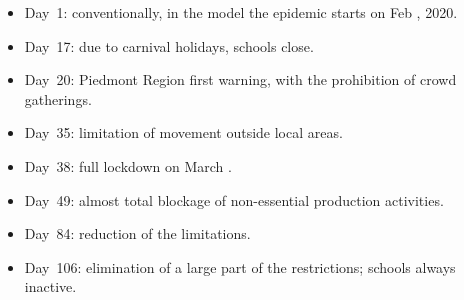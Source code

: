 \documentclass[11pt]{article}
\begin{document}
\begin{itemize}
\setlength{\itemsep}{0pt}

\item Day~1: conventionally, in the model the epidemic starts on Feb , 2020.

\item Day~17: due to carnival holidays, schools close.

\item Day~20: Piedmont Region first warning, with the prohibition of crowd gatherings.

\item Day~35: limitation of movement outside local areas.

\item Day~38: full lockdown on March .

\item Day~49: almost total blockage of non-essential production activities.

\item Day~84: reduction of the limitations.

\item Day~106: elimination of a large part of the restrictions; schools always inactive.

\end{itemize}




\end{document}
